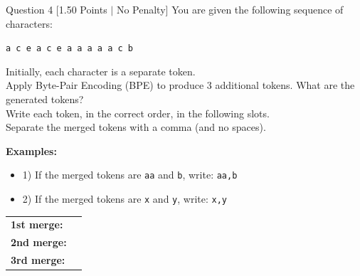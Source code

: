 \documentclass[11pt,a4paper]{article}
\begin{document}
\begin{questionbox}{Question 4 \hfill [1.50 Points $\vert$ No Penalty]}
You are given the following sequence of characters:
\begin{center}
\texttt{a c e a c e a a a a a c b}
\end{center}
Initially, each character is a separate token.\\
Apply Byte-Pair Encoding (BPE) to produce 3 additional tokens. What are the generated tokens?\\
Write each token, in the correct order, in the following slots.\\
Separate the merged tokens with a comma (and no spaces).

\medskip
\noindent
\textbf{Examples:}
\begin{itemize}[leftmargin=1.5em]
    \item 1) If the merged tokens are \texttt{aa} and \texttt{b}, write: \texttt{aa,b}
    \item 2) If the merged tokens are \texttt{x} and \texttt{y}, write: \texttt{x,y}
\end{itemize}

\medskip
\begin{tabular}{ll}
\textbf{1st merge:} & \underline{\hspace{4cm}} \\
\textbf{2nd merge:} & \underline{\hspace{4cm}} \\
\textbf{3rd merge:} & \underline{\hspace{4cm}} \\
\end{tabular}
\end{questionbox}
\end{document}
